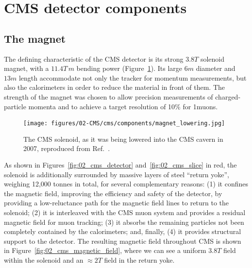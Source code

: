 \section{CMS detector components}
\label{sec:02_cms_detectors}

\subsection{The magnet}
\label{sec:02_cms_magnet}

The defining characteristic of the CMS detector is its strong $3.8\unit{T}$ solenoid magnet, with a $11.4 \unit{T\,m}$ bending power (Figure~\ref{fig:02_cms_magnet}).
Its large $6\unit{m}$ diameter and $13\unit{m}$ length accommodate not only the tracker for momentum measurements, but also the calorimeters in order to reduce the material in front of them.
The strength of the magnet was chosen to allow precision measurements of charged-particle momenta and to achieve a target \pt resolution of 10\% for 1\TeV muons.

\begin{figure}[ht]
    \centering
    \texttt{[image: figures/02-CMS/cms/components/magnet\_lowering.jpg]}
    \caption{The CMS solenoid, as it was being lowered into the CMS cavern in 2007, reproduced from Ref.~\cite{Maximilien:1020310}.}
    \label{fig:02_cms_magnet}
\end{figure}

As shown in Figures~\ref{fig:02_cms_detector} and~\ref{fig:02_cms_slice} in red, the solenoid is additionally surrounded by massive layers of steel ``return yoke'', weighing 12,000 tonnes in total, for several complementary reasons:
(1) it confines the magnetic field, improving the efficiency and safety of the detector, by providing a low-reluctance path for the magnetic field lines to return to the solenoid; 
(2) it is interleaved with the CMS muon system and provides a residual magnetic field for muon tracking; 
(3) it absorbs the remaining particles not been completely contained by the calorimeters; 
and, finally, (4) it provides structural support to the detector.
The resulting magnetic field throughout CMS is shown in Figure~\ref{fig:02_cms_magnetic_field}, where we can see a uniform $3.8\unit{T}$ field within the solenoid and an $\approx 2\unit{T}$ field in the return yoke.

